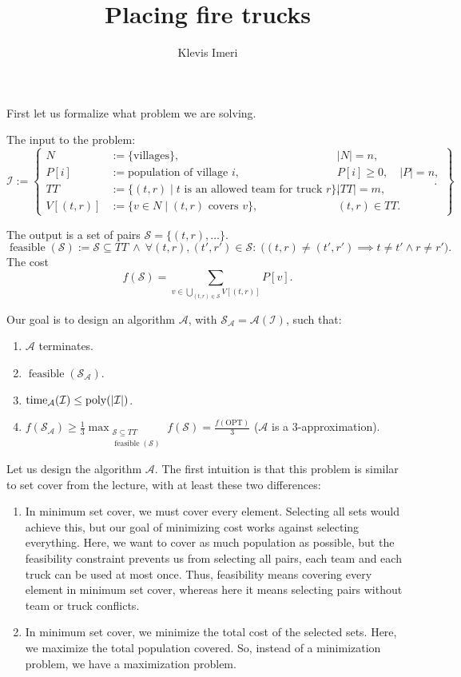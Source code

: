 \documentclass[12pt,a4paper]{article}
\title{Placing fire trucks}
\author{Klevis Imeri}
\date{}
\begin{document}
\maketitle

First let us formalize what problem we are solving.

The input to the problem:
\[
\mathcal{I} := \left\{
\begin{aligned}
N &:= \{\text{villages}\}, && |N|=n,\\
P[i] &:= \text{population of village }i, && P[i]\geq0,\quad |P|=n,\\
TT &:= \{(t,r)\mid t\text{ is an allowed team for truck }r\}, && |TT|=m,\\
V[(t,r)] &:= \{v\in N\mid (t,r)\text{ covers }v\}, && (t,r)\in TT.
\end{aligned}
\right\}.
\]

The output is a set of pairs $\mathcal{S}=\{(t,r),\ldots\}$.
\[
\operatorname{feasible}(\mathcal{S}):=
\mathcal{S}\subseteq TT\ \land\
\forall (t,r),(t',r')\in\mathcal{S}:\;
\bigl((t,r)\neq(t',r')\implies t\neq t'\land r\neq r'\bigr)
.
\]
The cost
\[
f(\mathcal{S}) =
\sum_{v\in\bigcup_{(t,r)\in\mathcal{S}} V[(t,r)]} P[v].
\]

Our goal is to design an algorithm $\mathcal{A}$, with
$\mathcal{S}_{\mathcal{A}}=\mathcal{A}(\mathcal{I})$, such that:
\begin{enumerate}
\item $\mathcal{A}$ terminates.
\item $\operatorname{feasible}(\mathcal{S}_{\mathcal{A}})$.
\item $\operatorname{time}_{\mathcal{A}}(\mathcal{I})\leq\operatorname{poly}(|\mathcal{I}|)$.
\item $\displaystyle f(\mathcal{S}_{\mathcal{A}})
\geq \frac{1}{3}\max_{\substack{\mathcal{S}\subseteq TT\\\operatorname{feasible}(\mathcal{S})}} f(\mathcal{S})
=\frac{f(\mathrm{OPT})}{3}$ ($\mathcal{A}$ is a $3$-approximation).
\end{enumerate}

Let us design the algorithm $\mathcal{A}$. The first intuition is that this problem
is similar to set cover from the lecture, with at least these two differences:
\begin{enumerate}
\item In minimum set cover, we must cover every element. Selecting all sets would
achieve this, but our goal of minimizing cost works against selecting everything.
Here, we want to cover as much population as possible, but the feasibility
constraint prevents us from selecting all pairs, each team and each truck can
be used at most once. Thus, feasibility means covering every element in minimum
set cover, whereas here it means selecting pairs without team or truck conflicts.
\item In minimum set cover, we minimize the total cost of the selected sets.
Here, we maximize the total population covered.
So, instead of a minimization problem, we have a maximization problem.
\end{enumerate}
\end{document}
